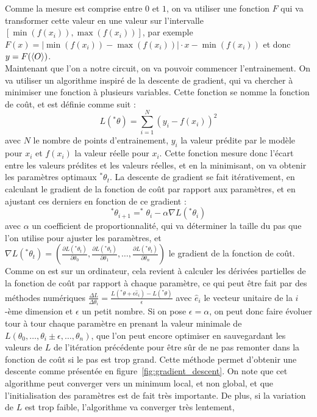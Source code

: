 Comme la mesure est comprise entre $0$ et $1$, on va utiliser une fonction $F$ qui va
transformer cette valeur en une valeur sur l'intervalle $[\min(f(x_i)), \max(f(x_i))]$,
par exemple $F(x) = |\min(f(x_i)) - \max(f(x_i))| \cdot x - \min(f(x_i))$ et donc
$y = F(\expval{O})$.\\
Maintenant que l'on a notre circuit, on va pouvoir commencer l'entrainement.
On va utiliser un algorithme inspiré de la descente de gradient, qui va chercher à minimiser
une fonction à plusieurs variables.
Cette fonction se nomme la fonction de coût, et est définie comme suit :
\[
    L(^*\theta) = \sum_{i=1}^{N} (y_i - f(x_i))^2
\]
avec $N$ le nombre de points d'entrainement, $y_i$ la valeur prédite par le modèle pour
$x_i$ et $f(x_i)$ la valeur réelle pour $x_i$.
Cette fonction mesure donc l'écart entre les valeurs prédites et les valeurs réelles, et
en la minimisant, on va obtenir les paramètres optimaux $^*\theta_t$.
La descente de gradient se fait itérativement, en calculant le gradient de la fonction de coût
par rapport aux paramètres, et en ajustant ces derniers en fonction de ce gradient :
\[
    ^*\theta_{i+1} = ^*\theta_i - \alpha \nabla L(^*\theta_i)
\]
avec $\alpha$ un coefficient de proportionnalité, qui va déterminer la taille du pas que l'on
utilise pour ajuster les paramètres, et $\nabla L(^*\theta_t) = \left(\frac{\partial L(^*\theta_t)}{\partial \theta_0}, \frac{\partial L(^*\theta_t)}{\partial \theta_1}, \ldots, \frac{\partial L(^*\theta_t)}{\partial \theta_n}\right)$ le gradient de la fonction de coût.
Comme on est sur un ordinateur, cela revient à calculer les dérivées partielles de la fonction
de coût par rapport à chaque paramètre, ce qui peut être fait par des méthodes numériques
$\frac{\Delta L}{\Delta \theta_i} = \frac{L(^*\theta + \epsilon \hat{e}_i) - L(^*\theta)}{\epsilon}$
avec $\hat{e}_i$ le vecteur unitaire de la $i$-ème dimension et $\epsilon$ un petit nombre.
Si on pose $\epsilon = \alpha$, on peut donc faire évoluer tour à tour chaque paramètre
en prenant la valeur minimale de $L(\theta_0, \ldots, \theta_i \pm \epsilon, \ldots, \theta_n)$,
que l'on peut encore optimiser en sauvegardant les valeurs de $L$ de l'itération précédente
pour être sûr de ne pas remonter dans la fonction de coût si le pas est trop grand.
Cette méthode permet d'obtenir une descente comme présentée en figure~\ref{fig:gradient_descent}.
On note que cet algorithme peut converger vers un minimum local, et non global, et que
l'initialisation des paramètres est de fait très importante.
De plus, si la variation de $L$ est trop faible, l'algorithme va converger très lentement,
